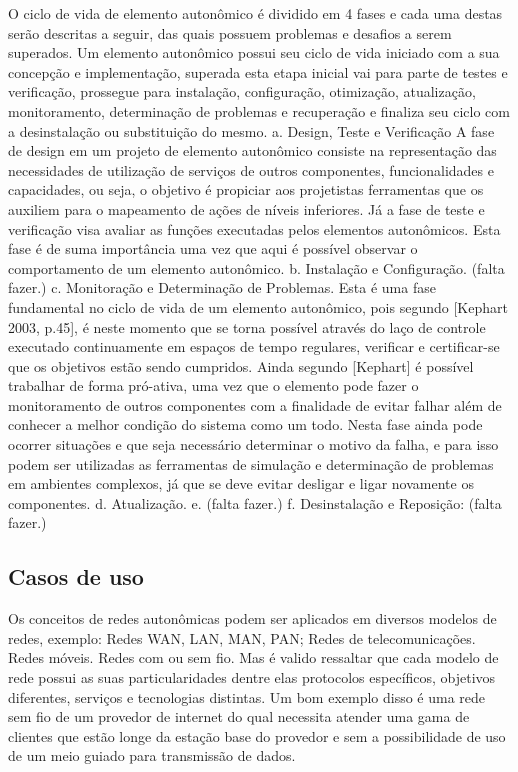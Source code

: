 \documentclass[11pt,twoside]{article}
\begin{document}
O ciclo de vida de elemento autonômico é dividido em 4 fases e cada uma destas serão descritas a seguir, das quais possuem problemas e desafios a serem superados. Um elemento autonômico possui seu ciclo de vida iniciado com a sua concepção e implementação, superada esta etapa inicial vai para parte de testes e verificação, prossegue para instalação, configuração, otimização, atualização, monitoramento, determinação de problemas e recuperação e finaliza seu ciclo com a desinstalação ou substituição do mesmo.
a.	Design, Teste e Verificação
A fase de design em um projeto de elemento autonômico consiste na representação das necessidades de utilização de serviços de outros componentes, funcionalidades e capacidades, ou seja, o objetivo é propiciar aos projetistas ferramentas que os auxiliem para o mapeamento de ações de níveis inferiores. Já a fase de teste e verificação visa avaliar as funções executadas pelos elementos autonômicos. Esta fase é de suma importância uma vez que aqui é possível observar o comportamento de um elemento autonômico.
b.	Instalação e Configuração.
(falta fazer.)
c.	Monitoração e Determinação de Problemas.
Esta é uma fase fundamental no ciclo de vida de um elemento autonômico, pois segundo [Kephart 2003, p.45], é neste momento que se torna possível através do laço de controle executado continuamente em espaços de tempo regulares, verificar e certificar-se que os objetivos estão sendo cumpridos. Ainda segundo [Kephart] é possível trabalhar de forma pró-ativa, uma vez que o elemento pode fazer o monitoramento de outros componentes com a finalidade de evitar falhar além de conhecer a melhor condição do sistema como um todo. Nesta fase ainda pode ocorrer situações e que seja necessário determinar o motivo da falha, e para isso podem ser utilizadas as ferramentas de simulação e determinação de problemas em ambientes complexos, já que se deve evitar desligar e ligar novamente os componentes.
d.	Atualização.
e.	(falta fazer.)
f.	Desinstalação e Reposição:
(falta fazer.)

\subsection{Casos de uso}
Os conceitos de redes autonômicas podem ser aplicados em diversos modelos de redes, exemplo:
	Redes WAN, LAN, MAN, PAN;
	Redes de telecomunicações.
	Redes móveis.
	Redes com ou sem fio.
Mas é valido ressaltar que cada modelo de rede possui as suas particularidades dentre elas protocolos específicos, objetivos diferentes, serviços e tecnologias distintas. Um bom exemplo disso é uma rede sem fio de um provedor de internet do qual necessita atender uma gama de clientes que estão longe da estação base do provedor e sem a possibilidade de uso de um meio guiado para transmissão de dados.
\end{document}
